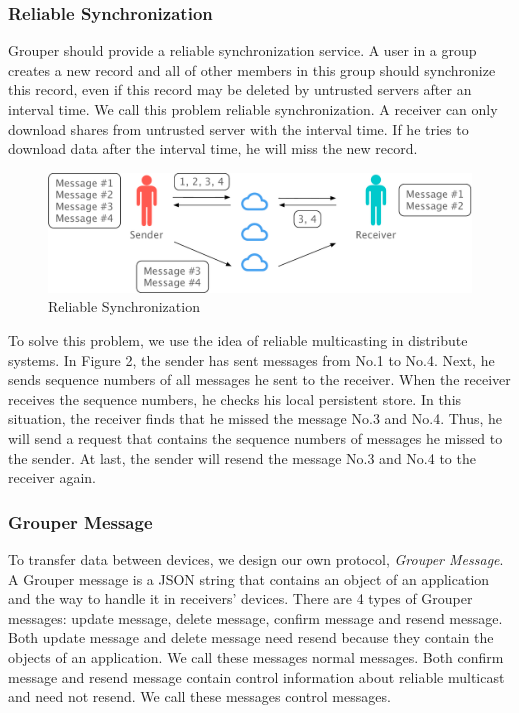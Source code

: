 \documentclass[twocolumn,10pt]{article}
\begin{document}
\subsubsection{Reliable Synchronization}

Grouper should provide a reliable synchronization service. 
A user in a group creates a new record and all of other members in this group should synchronize this record, even if this record may be deleted by untrusted servers after an interval time. 
We call this problem reliable synchronization. 
A receiver can only download shares from untrusted server with the interval time. 
If he tries to download data after the interval time, he will miss the new record.

\begin{figure}[t]
	\centering
	\includegraphics[scale=0.3]{reliable_sync}
	\caption{Reliable Synchronization}
\end{figure}

To solve this problem, we use the idea of reliable multicasting in distribute systems. 
In Figure 2, the sender has sent messages from No.1 to No.4. 
Next, he sends sequence numbers of all messages he sent to the receiver. 
When the receiver receives the sequence numbers, he checks his local persistent store. 
In this situation, the receiver finds that he missed the message No.3 and No.4. 
Thus, he will send a request that contains the sequence numbers of messages he missed to the sender. 
At last, the sender will resend the message No.3 and No.4 to the receiver again.

\subsubsection{Grouper Message}

To transfer data between devices, we design our own protocol, \emph{Grouper Message}. 
A Grouper message is a JSON string that contains an object of an application and the way to handle it in receivers’ devices. 
There are 4 types of Grouper messages: update message, delete message, confirm message and resend message. 
Both update message and delete message need resend because they contain the objects of an application. 
We call these messages normal messages. 
Both confirm message and resend message contain control information about reliable multicast and need not resend. 
We call these messages control messages.
\end{document}
